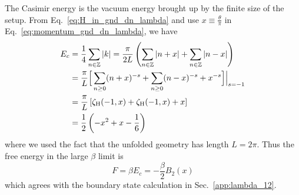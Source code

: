 The Casimir energy is the vacuum energy brought up by the finite size of the setup. From Eq.~\eqref{eq:H_in_gnd_dn_lambda} and use $x\equiv \frac{\theta}{\pi}$ in Eq.~\eqref{eq:momentum_gnd_dn_lambda}, we have
\begin{equation}
\begin{aligned}
E_c &= \frac{1}{4} \sum_{n \in \mathbb{Z}} | k| = \frac{\pi}{2L} \left( \sum_{n \in \mathbb{Z}}  | n + x | + \sum_{n \in \mathbb{Z}}  | n - x |  \right) \\  
&= \frac{\pi}{L} \Big[\sum_{n \ge 0 } ( n + x )^{-s} + \sum_{n \ge 0 }  ( n - x)^{-s}  +   x^{-s} \Big]\Big|_{s = -1} \\
&= \frac{\pi}{L} \left[ \zeta_{\rm H}( -1, x ) + \zeta_{\rm H}( -1, x ) +  x \right] \\
&= \frac{1}{2} \left( - x^2 + x - \frac{1}{6}\right)
\end{aligned}
\end{equation}
where we used the fact that the unfolded geometry has length $L=2\pi$. Thus the free energy in the large $\beta$ limit is
\begin{equation}
F = \beta E_c = - \frac{\beta}{2} B_2( x) 
\end{equation}
which agrees with the boundary state calculation in Sec.~\ref{app:lambda_12}. 

